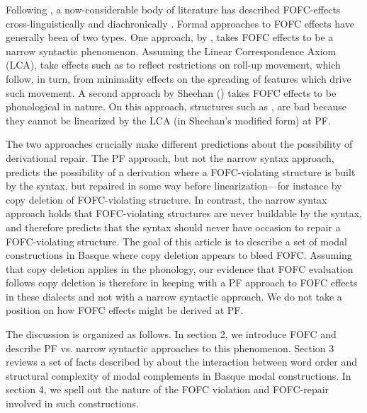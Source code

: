 \documentclass[output=paper]{langscibook}
\begin{document}
Following \cite{holmberg2000}, a now-considerable body of literature has described FOFC-effects cross-linguistically 
 \citep{holmberg2000,biberaueretal2008,biberaueretal2014, sheehan2013, sheehan2012} and diachronically \citep{biberaueretal2009, biberaueretal2010}. Formal approaches to FOFC effects have generally been of two types.\footnotemark\protect{}  One approach, by \cite{biberaueretal2014}, takes FOFC effects to be a narrow syntactic phenomenon.  Assuming the Linear Correspondence Axiom (LCA)\citep{kayne1994}, \cite{biberaueretal2014} take effects such as \LLast to reflect restrictions on roll-up movement, which follow, in turn, from minimality effects on the spreading of features which drive such movement.  A second approach by Sheehan (\citeyear{sheehan2013a,sheehan2013b,sheehan2017}) takes FOFC effects to be phonological in nature.  On this approach, structures such as \LLast[d], are bad because they cannot be linearized by the LCA (in Sheehan's modified form) at PF.  

The two approaches crucially make different predictions about the possibility of derivational repair.  
The PF approach, but not the narrow syntax approach, predicts the possibility of a derivation where a FOFC-violating structure is built by the syntax, but repaired in some way before linearization---for instance by copy deletion of FOFC-violating structure.  In contrast, the narrow syntax approach holds that FOFC-violating structures are never buildable by the syntax, and therefore predicts that the syntax should never have occasion to repair a FOFC-violating structure.  The goal of this article is to describe a set of modal constructions in Basque where copy deletion appears to bleed FOFC.  Assuming that copy deletion applies in the phonology, our evidence that FOFC evaluation follows copy deletion is therefore in keeping with a PF approach to FOFC effects in these dialects and not with a narrow syntactic approach. We do not take a position on how FOFC effects might be derived at PF.

The discussion is organized as follows.  In section 2, we introduce FOFC and describe PF vs. narrow syntactic approaches to this phenomenon.  Section 3 reviews a set of facts described by \cite{etxepare-uribeetxebarria2009} about the interaction between word order and structural complexity of modal complements in Basque modal constructions.  In section 4, we spell out the nature of the FOFC violation and FOFC-repair involved in such constructions.  
\end{document}
